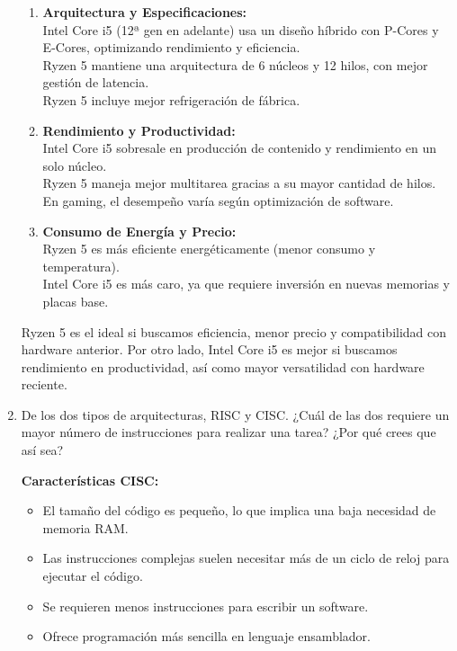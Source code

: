\documentclass[12pt,letterpaper]{article}
\begin{document}
\begin{enumerate}
  \begin{enumerate}
  \item \textbf{Arquitectura y Especificaciones:}\\
    Intel Core i5 (12ª gen en adelante) usa un diseño híbrido con P-Cores y E-Cores, optimizando rendimiento y eficiencia.\\
    Ryzen 5 mantiene una arquitectura de 6 núcleos y 12 hilos, con mejor gestión de latencia.\\
    Ryzen 5 incluye mejor refrigeración de fábrica.

  \item \textbf{Rendimiento y Productividad:}\\
    Intel Core i5 sobresale en producción de contenido y rendimiento en un solo núcleo.\\
    Ryzen 5 maneja mejor multitarea gracias a su mayor cantidad de hilos.\\
    En gaming, el desempeño varía según optimización de software.
    
  \item \textbf{Consumo de Energía y Precio:}\\
    Ryzen 5 es más eficiente energéticamente (menor consumo y temperatura).\\
    Intel Core i5 es más caro, ya que requiere inversión en nuevas memorias y placas base.
  \end{enumerate}

  Ryzen 5 es el ideal si buscamos eficiencia, menor precio y compatibilidad con hardware anterior. Por otro lado, Intel Core i5 es mejor si buscamos rendimiento en productividad, así como mayor versatilidad con hardware reciente.
  \bigskip
  
\item De los dos tipos de arquitecturas, RISC y CISC. ¿Cuál de las dos requiere un mayor número de instrucciones para realizar una tarea? ¿Por qué crees que así sea?
  \bigskip
  
  \textbf{Características CISC:}
  \begin{itemize}
  \item El tamaño del código es pequeño, lo que implica una baja necesidad de memoria RAM.
  \item Las instrucciones complejas suelen necesitar más de un ciclo de reloj para ejecutar el código.
  \item Se requieren menos instrucciones para escribir un software.
  \item Ofrece programación más sencilla en lenguaje ensamblador.
  \end{itemize}


\end{enumerate}
\end{document}
